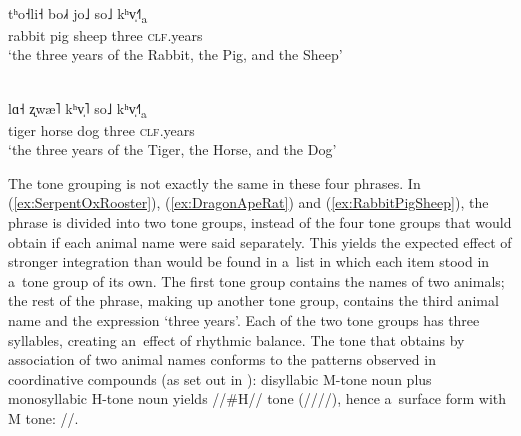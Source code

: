 \begin{exe}
	\ex
	\label{ex:RabbitPigSheep}
	\\
	\gll tʰo˧li˧	bo˩˧		jo˩		so˩		kʰv̩˧˥\textsubscript{a}\\
	rabbit		pig			sheep	three	\textsc{clf}.years\\
	\glt ‘the three years of the Rabbit, the Pig, and the Sheep’
\end{exe}

\begin{exe}
	\ex
	\label{ex:TigerHorseDog}
	\\
	\gll lɑ˧		ʐwæ˥	kʰv̩˥		so˩		kʰv̩˧˥\textsubscript{a}\\
	tiger		horse	dog	three	\textsc{clf}.years\\
	\glt ‘the three years of the Tiger, the Horse, and the Dog’
\end{exe}




The tone grouping is not exactly the same in these four phrases. In (\ref{ex:SerpentOxRooster}), (\ref{ex:DragonApeRat}) and (\ref{ex:RabbitPigSheep}), the phrase is divided into two tone groups, instead of the four tone groups that would obtain if each animal name were said separately. This yields the expected effect of stronger integration than would be found in a~list in which each item stood in a~tone group of its own. The first tone group contains the names of two animals; the rest of the phrase, making up another tone group, contains the third animal name and the expression ‘three years’. Each of the two tone groups has three syllables, creating an~effect of rhythmic balance. The tone that obtains by association of two animal names conforms to the patterns observed in coordinative compounds (as set out in ): disyllabic M-tone noun plus {monosyllabic} H-tone noun yields \mbox{//\#H//} tone (////), hence a~surface form with M tone: //.

